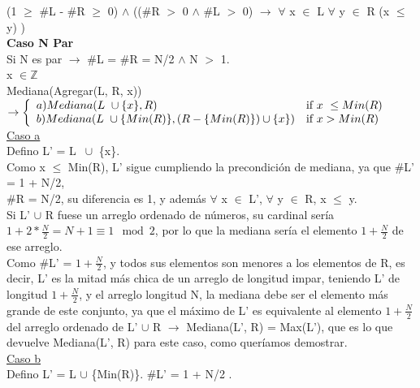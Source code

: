 \documentclass{article}
\theoremstyle{definition}
\theoremstyle{remark}
\begin{document}
(1 $\geq$ \#L - \#R $\geq$ 0) $\wedge$ ((\#R $>$ 0 $\wedge$ \#L $>$ 0) $\rightarrow$ $\forall$ x $\in$ L $\forall$ y $\in$ R (x $\leq$ y) ) \\

\textbf{Caso N Par}\\ 

Si N es par $\rightarrow$ \#L = \#R = N/2 $\wedge$ N $>$ 1.\\ 

x $\in \mathds{Z}$ \\

Mediana(Agregar(L, R, x)) $\rightarrow \twopartdef{ a) Mediana(L \ \cup \{x\}, R)}
                                                        {x \ \leq Min(R)}
                                                    {b) Mediana(L  \ \cup \{Min(R)\}, (R - \{Min(R)\}) \cup \{x\})}
                                                        {x > Min(R)}$\\
                                                        
\underline{Caso a}\\

Defino L' = L $\ \cup$ \{x\}.\\

Como x $\leq$ Min(R), L' sigue cumpliendo la precondición de mediana, ya que \#L' = 1 + N/2, \\ \#R = N/2, su diferencia es 1, y además $\forall$ x $\in$ L', $\forall$ y $\in$ R, x $\leq$ y. \\
Si L' $\cup$ R fuese un arreglo ordenado de números, su cardinal sería $1 + 2 * \frac{N}{2} = N + 1 \equiv 1 \mod 2$, por lo que la mediana sería el elemento $1 + \frac{N}{2}$ de ese arreglo. \\
Como \#L' = $1 + \frac{N}{2}$, y todos sus elementos son menores a los elementos de R, es decir, L' es la mitad más chica de un arreglo de longitud impar, teniendo L' de longitud $1 + \frac{N}{2}$, y el arreglo longitud N, la mediana debe ser el elemento más grande de este conjunto, ya que el máximo de L' es equivalente al elemento $1 + \frac{N}{2}$ del arreglo ordenado de L' $\cup$ R $\rightarrow$ Mediana(L', R) = Max(L'), que es lo que devuelve Mediana(L', R) para este caso, como queríamos demostrar.\\

\underline{Caso b}\\

Defino L' = L $\cup$ \{Min(R)\}.  \#L' = 1 + N/2 . \\
\end{document}
